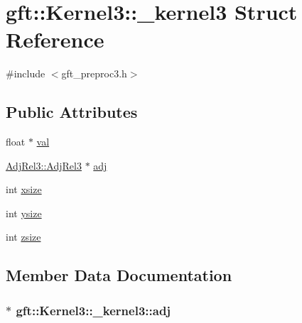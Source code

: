 \hypertarget{structgft_1_1Kernel3_1_1__kernel3}{}\section{gft\+:\+:Kernel3\+:\+:\+\_\+kernel3 Struct Reference}
\label{structgft_1_1Kernel3_1_1__kernel3}


{\ttfamily \#include $<$gft\+\_\+preproc3.\+h$>$}

\subsection*{Public Attributes}
\begin{DoxyCompactItemize}
\item 
float $\ast$ \hyperlink{structgft_1_1Kernel3_1_1__kernel3_a2cf5ef95427f4d81f2634a065f69c0af}{val}
\item 
\hyperlink{namespacegft_1_1AdjRel3_a0d54e2f148bf5636f3a3faf70d4eb5ae}{Adj\+Rel3\+::\+Adj\+Rel3} $\ast$ \hyperlink{structgft_1_1Kernel3_1_1__kernel3_aaca1908dcf4adcb6f2c248d950f89821}{adj}
\item 
int \hyperlink{structgft_1_1Kernel3_1_1__kernel3_af168a4a8ef87b8044048f61b7eda1ea6}{xsize}
\item 
int \hyperlink{structgft_1_1Kernel3_1_1__kernel3_a7969c6204643647713a7f57b65a9840d}{ysize}
\item 
int \hyperlink{structgft_1_1Kernel3_1_1__kernel3_a4571d07a33802441efb94822dea3d665}{zsize}
\end{DoxyCompactItemize}


\subsection{Member Data Documentation}
\subsubsection[{\texorpdfstring{adj}{adj}}]{$\ast$ gft\+::\+Kernel3\+::\+\_\+kernel3\+::adj}\hypertarget{structgft_1_1Kernel3_1_1__kernel3_aaca1908dcf4adcb6f2c248d950f89821}{}\label{structgft_1_1Kernel3_1_1__kernel3_aaca1908dcf4adcb6f2c248d950f89821}
